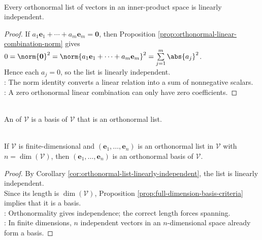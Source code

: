 \begin{corollary} \label{cor:orthonormal-list-linearly-independent} \\
Every orthonormal list of vectors in an inner-product space is linearly independent.
\begin{proof}
If $a_1\mathbf{e}_1+\cdots+a_m\mathbf{e}_m=\mathbf{0}$, then Proposition \ref{prop:orthonormal-linear-combination-norm} gives $0=\norm{\mathbf{0}}^2=\norm{a_1\mathbf{e}_1+\cdots+a_m\mathbf{e}_m}^2=\sum\limits_{j=1}^{m}\abs{a_j}^2$.\\
Hence each $a_j=0$, so the list is linearly independent.\\
: The norm identity converts a linear relation into a sum of nonnegative scalars.\\
: A zero orthonormal linear combination can only have zero coefficients.
\end{proof}
\end{corollary}

\begin{definition} \label{def:orthonormal-basis} \\
An  of $\mathcal{V}$ is a basis of $\mathcal{V}$ that is an orthonormal list.
\end{definition}

\begin{proposition} \label{prop:right-length-orthonormal-list-is-basis} \\
If $\mathcal{V}$ is finite-dimensional and $(\mathbf{e}_1,\ldots,\mathbf{e}_n)$ is an orthonormal list in $\mathcal{V}$ with $n=\dim(\mathcal{V})$, then $(\mathbf{e}_1,\ldots,\mathbf{e}_n)$ is an orthonormal basis of $\mathcal{V}$.
\begin{proof}
By Corollary \ref{cor:orthonormal-list-linearly-independent}, the list is linearly independent.\\
Since its length is $\dim(\mathcal{V})$, Proposition \ref{prop:full-dimension-basis-criteria} implies that it is a basis.\\
: Orthonormality gives independence; the correct length forces spanning.\\
: In finite dimensions, $n$ independent vectors in an $n$-dimensional space already form a basis.
\end{proof}
\end{proposition}

